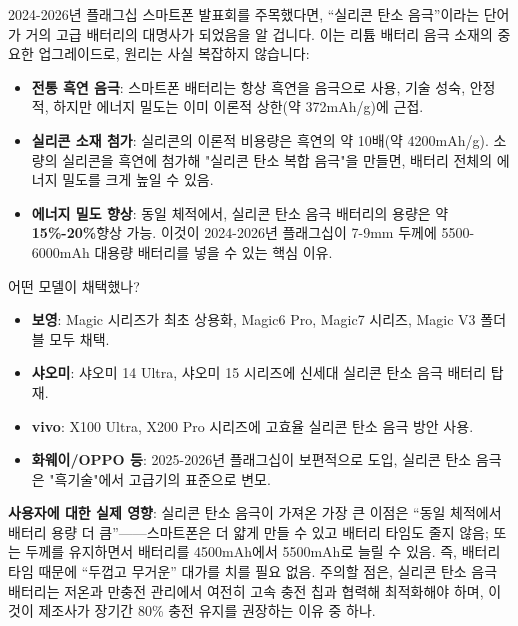 
2024-2026년 플래그십 스마트폰 발표회를 주목했다면, “실리콘 탄소 음극”이라는 단어가 거의 고급 배터리의 대명사가 되었음을 알 겁니다. 이는 리튬 배터리 음극 소재의 중요한 업그레이드로, 원리는 사실 복잡하지 않습니다:

\begin{itemize}
  \item \textbf{전통 흑연 음극}: 스마트폰 배터리는 항상 흑연을 음극으로 사용, 기술 성숙, 안정적, 하지만 에너지 밀도는 이미 이론적 상한(약 372mAh/g)에 근접.
  \item \textbf{실리콘 소재 첨가}: 실리콘의 이론적 비용량은 흑연의 약 10배(약 4200mAh/g). 소량의 실리콘을 흑연에 첨가해 "실리콘 탄소 복합 음극"을 만들면, 배터리 전체의 에너지 밀도를 크게 높일 수 있음.
  \item \textbf{에너지 밀도 향상}: 동일 체적에서, 실리콘 탄소 음극 배터리의 용량은 약\textbf{15\%-20\%}향상 가능. 이것이 2024-2026년 플래그십이 7-9mm 두께에 5500-6000mAh 대용량 배터리를 넣을 수 있는 핵심 이유.
\end{itemize}

\begin{tcbinfo}{어떤 모델이 채택했나?}
\begin{itemize}
  \item \textbf{보영}: Magic 시리즈가 최초 상용화, Magic6 Pro, Magic7 시리즈, Magic V3 폴더블 모두 채택.
  \item \textbf{샤오미}: 샤오미 14 Ultra, 샤오미 15 시리즈에 신세대 실리콘 탄소 음극 배터리 탑재.
  \item \textbf{vivo}: X100 Ultra, X200 Pro 시리즈에 고효율 실리콘 탄소 음극 방안 사용.
  \item \textbf{화웨이/OPPO 등}: 2025-2026년 플래그십이 보편적으로 도입, 실리콘 탄소 음극은 "흑기술"에서 고급기의 표준으로 변모.
\end{itemize}

\end{tcbinfo}

\textbf{사용자에 대한 실제 영향}: 실리콘 탄소 음극이 가져온 가장 큰 이점은 “동일 체적에서 배터리 용량 더 큼”——스마트폰은 더 얇게 만들 수 있고 배터리 타임도 줄지 않음; 또는 두께를 유지하면서 배터리를 4500mAh에서 5500mAh로 늘릴 수 있음. 즉, 배터리 타임 때문에 “두껍고 무거운” 대가를 치를 필요 없음. 주의할 점은, 실리콘 탄소 음극 배터리는 저온과 만충전 관리에서 여전히 고속 충전 칩과 협력해 최적화해야 하며, 이것이 제조사가 장기간 80\% 충전 유지를 권장하는 이유 중 하나.

